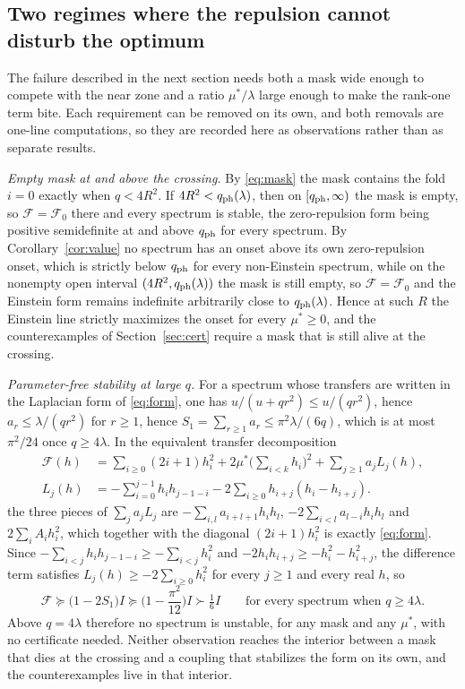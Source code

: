 \documentclass[11pt]{article}
\newcommand{\Fcal}{\mathcal F}
\newcommand{\muS}{\mu^{*}}
\theoremstyle{definition}
\theoremstyle{remark}
\begin{document}
\subsection{Two regimes where the repulsion cannot disturb the optimum}

The failure described in the next section needs both a mask wide enough to compete with
the near zone and a ratio $\muS/\lambda$ large enough to make the rank-one term bite. Each
requirement can be removed on its own, and both removals are one-line computations, so
they are recorded here as observations rather than as separate results.

\emph{Empty mask at and above the crossing.} By \eqref{eq:mask} the mask contains the fold
$i=0$ exactly when $q<4R^2$. If $4R^2<q_{\rm ph}(\lambda)$, then on $[q_{\rm ph},\infty)$
the mask is empty, so $\Fcal=\Fcal_0$ there and every spectrum is stable, the zero-repulsion
form being positive semidefinite at and above $q_{\rm ph}$ for every spectrum. By
Corollary~\ref{cor:value} no spectrum has an onset above its own zero-repulsion onset,
which is strictly below $q_{\rm ph}$ for every non-Einstein spectrum, while on the nonempty
open interval $(4R^2,q_{\rm ph}(\lambda))$ the mask is still empty, so $\Fcal=\Fcal_0$ and
the Einstein form remains indefinite arbitrarily close to $q_{\rm ph}(\lambda)$.
Hence at such $R$ the Einstein line strictly maximizes the onset for every $\muS\ge0$, and
the counterexamples of Section~\ref{sec:cert} require a mask that is still alive at the
crossing.

\emph{Parameter-free stability at large $q$.} For a spectrum whose transfers are written
in the Laplacian form of \eqref{eq:form}, one has $u/(u+qr^2)\le u/(qr^2)$, hence
$a_r\le\lambda/(qr^2)$ for $r\ge1$, hence $S_1=\sum_{r\ge1}a_r\le\pi^2\lambda/(6q)$, which
is at most $\pi^2/24$ once $q\ge4\lambda$. In the equivalent transfer decomposition
\begin{equation}\label{eq:decomp}
\begin{aligned}
\Fcal(h)&=\sum_{i\ge0}(2i+1)h_i^2+2\muS\Big(\sum_{i<k}h_i\Big)^2+\sum_{j\ge1}a_jL_j(h),\\
L_j(h)&=-\sum_{i=0}^{j-1}h_ih_{j-1-i}-2\sum_{i\ge0}h_{i+j}(h_i-h_{i+j}).
\end{aligned}
\end{equation}
the three pieces of $\sum_ja_jL_j$ are $-\sum_{i,l}a_{i+l+1}h_ih_l$,
$-2\sum_{i<l}a_{l-i}h_ih_l$ and $2\sum_iA_ih_i^2$, which together with the diagonal
$(2i+1)h_i^2$ is exactly \eqref{eq:form}. Since
$-\sum_{i<j}h_ih_{j-1-i}\ge-\sum_{i<j}h_i^2$ and $-2h_ih_{i+j}\ge-h_i^2-h_{i+j}^2$, the
difference term satisfies $L_j(h)\ge-2\sum_{i\ge0}h_i^2$ for every $j\ge1$ and every real
$h$, so
\begin{equation}\label{eq:asym}
\Fcal\succeq\Big(1-2S_1\Big)I\succeq\Big(1-\frac{\pi^2}{12}\Big)I\succ\tfrac16 I
\qquad\text{for every spectrum when } q\ge4\lambda .
\end{equation}
Above $q=4\lambda$ therefore no spectrum is unstable, for any mask and any $\muS$, with no
certificate needed. Neither observation reaches the interior between a mask that dies at
the crossing and a coupling that stabilizes the form on its own, and the counterexamples
live in that interior.
\end{document}
